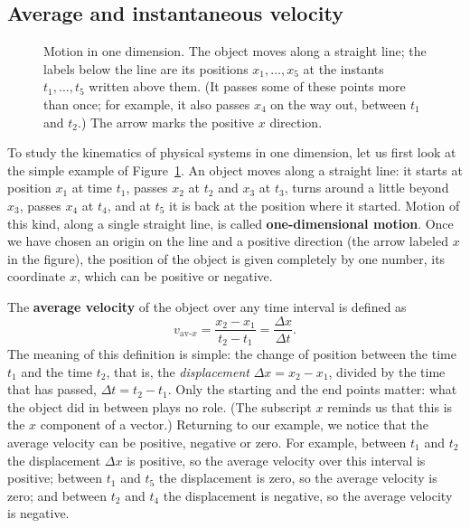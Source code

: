 \documentclass[11pt,a4paper]{article}
\newcommand{\vavx}{v_{\mathrm{av}\text{-}x}}   %
\begin{document}
\subsection{Average and instantaneous velocity}\label{sec:velocity}

\begin{figure}[ht]
\centering
{}
\caption{Motion in one dimension. The object moves along a straight line; the labels below the
line are its positions $x_1,\dots,x_5$ at the instants $t_1,\dots,t_5$ written above them. (It
passes some of these points more than once; for example, it also passes $x_4$ on the way out,
between $t_1$ and $t_2$.) The arrow marks the positive $x$ direction.}\label{fig:line}
\end{figure}

To study the kinematics of physical systems in one dimension, let us first look at the simple
example of Figure~\ref{fig:line}. An object moves along a straight line: it starts at position
$x_1$ at time $t_1$, passes $x_2$ at $t_2$ and $x_3$ at $t_3$, turns around a little beyond $x_3$,
passes $x_4$ at $t_4$, and at $t_5$ it is back at the position where it started. Motion of this
kind, along a single straight line, is called \textbf{one-dimensional motion}. Once we have chosen
an origin on the line and a positive direction (the arrow labeled $x$ in the figure), the position
of the object is given completely by one number, its coordinate $x$, which can be positive or
negative.

The \textbf{average velocity} of the object over any time interval is defined as
\begin{equation}\label{eq:vav}
  \vavx = \frac{x_2 - x_1}{t_2 - t_1} = \frac{\Delta x}{\Delta t} .
\end{equation}
The meaning of this definition is simple: the change of position between the time $t_1$ and the
time $t_2$, that is, the \emph{displacement} $\Delta x = x_2 - x_1$, divided by the time that has
passed, $\Delta t = t_2 - t_1$. Only the starting and the end points matter: what the object did
in between plays no role. (The subscript $x$ reminds us that this is the $x$ component of a
vector.) Returning to our example, we notice that the average velocity can be positive, negative
or zero. For example, between $t_1$ and $t_2$ the displacement $\Delta x$ is positive, so the
average velocity over this interval is positive; between $t_1$ and $t_5$ the displacement is zero,
so the average velocity is zero; and between $t_2$ and $t_4$ the displacement is negative, so the
average velocity is negative.
\end{document}
